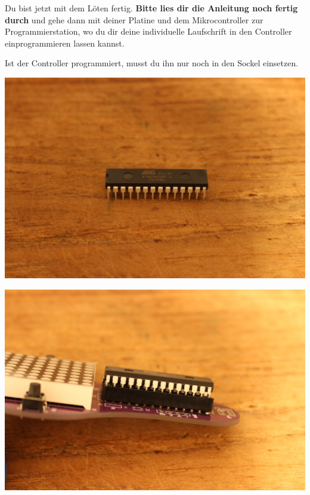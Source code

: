 \documentclass{article}
\begin{document}
Du bist jetzt mit dem Löten fertig. \textbf{Bitte lies dir die Anleitung noch fertig durch} und gehe dann mit deiner Platine und dem Mikrocontroller zur Programmierstation, wo du dir deine individuelle Laufschrift in den Controller einprogrammieren lassen kannst.

Ist der Controller programmiert, musst du ihn nur noch in den Sockel einsetzen.

\vspace{1cm}

\begin{minipage}[b]{0.5\textwidth}
	\includegraphics[width=\textwidth]{Bilder2024/IMG_0080.JPG}
\end{minipage}
\begin{minipage}[b]{0.5\textwidth}
	\includegraphics[width=\textwidth]{Bilder2024/IMG_0082.JPG}
\end{minipage}
\end{document}
